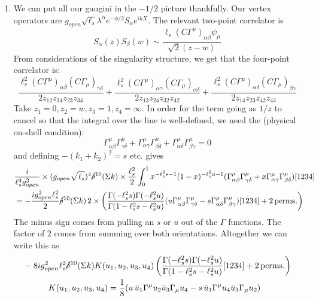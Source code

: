 \documentclass[11pt, class=article, crop=false]{standalone}
\begin{document}
\begin{enumerate}
	\item We can put all our gaugini in the $-1/2$ picture thankfully. Our vertex operators are $g_{open} \sqrt{\ell_s} \lambda^\alpha e^{-\phi/2} S_\alpha e^{ikX}$. The relevant two-point correlator is
	\[
		S_\alpha(z) S_\beta(w) \sim \frac{\ell_s (C \Gamma^\mu)_{\alpha \beta} \psi_\mu}{\sqrt 2 (z-w)}%
	\]
	 From considerations of the singularity structure, we get that the four-point correlator is:
	\[
		\frac{\ell_s^2 (C \Gamma^\mu)_{\alpha \beta} (C \Gamma_\mu)_{\gamma \delta}}{2 z_{12} z_{34} z_{23} z_{34}}
		 + \frac{\ell_s^2 (C \Gamma^\mu)_{\alpha \gamma} (C \Gamma_\mu)_{\alpha \delta}}{2 z_{13} z_{24} z_{32} z_{42}} 
		 + \frac{\ell_s^2 (C \Gamma^\mu)_{\alpha \delta} (C \Gamma_\mu)_{\beta \gamma}}{2 z_{14} z_{23} z_{42} z_{43}}
	\]
	Take $z_1 = 0, z_2 = w, z_3 = 1, z_4 = \infty$. In order for the term going as $1/z$ to cancel so that the integral over the line is well-defined, we need the (physical on-shell condition):
	\[
		\Gamma^\mu_{\alpha \beta} \Gamma^\mu_{\gamma \delta} +
		\Gamma^\mu_{\alpha \gamma} \Gamma^\mu_{\beta \delta} +
		\Gamma^\mu_{\alpha \delta} \Gamma^\mu_{\beta \gamma} = 0
	\]
	 and defining $- (k_1 + k_2)^2 = s$ etc. gives
	\[
	\begin{aligned}
		&\frac{i}{\ell_s^4 g_{open}^2} \times (g_{open} \sqrt{\ell_s})^4 \cancel\delta^{10}(\Sigma k) \times \frac{\ell_s^2}{2} \int_0^1 x^{-\ell_s^2 s - 1} (1-x)^{-\ell_s^2 u - 1} (\Gamma_{\alpha \beta}^\mu \Gamma_{\gamma \delta}^\mu + x \Gamma_{\alpha \gamma}^\mu \Gamma_{\beta \delta}^\mu) [1234]\\
		&= - \frac{i g_{open}^2 \ell_s^2 }{2} \cancel\delta^{10}(\Sigma k) \, 2 \times \left( \frac{\Gamma(-\ell_s^2 s) \Gamma(-\ell_s^2 u)}{\Gamma(1 - \ell_s^2 s - \ell_s^2 u)} (u \Gamma_{\alpha \beta}^\mu \Gamma_{\gamma \delta}^\mu - s \Gamma_{\alpha \delta}^\mu \Gamma_{\beta \gamma}^\mu) [1234] + 2 \,\mathrm{perms.} \right)
	\end{aligned}
	\]
	The minus sign comes from pulling an $s$ or $u$ out of the $\Gamma$ functions. The factor of $2$ comes from summing over both orientations. Altogether we can write this as
	\[
	\begin{aligned}
		&-8 i g_{open}^2 \ell_s^2 \cancel\delta^{10}(\Sigma k) K(u_1, u_2, u_3, u_4) \left( \frac{\Gamma(-\ell_s^2 s) \Gamma(-\ell_s^2 u)}{\Gamma(1 - \ell_s^2 s - \ell_s^2 u)} [1234] + 2 \,\mathrm{perms.} \right)\\
		& \qquad \quad K(u_1, u_2, u_3, u_4) = \frac18 (u \, \bar u_1\Gamma^\mu u_2 \bar u_3 \Gamma_\mu u_4 - s\, \bar u_1 \Gamma^\mu u_4 \bar u_3 \Gamma_\mu u_2)
	\end{aligned}
	\]
	

\end{enumerate}
\end{document}
